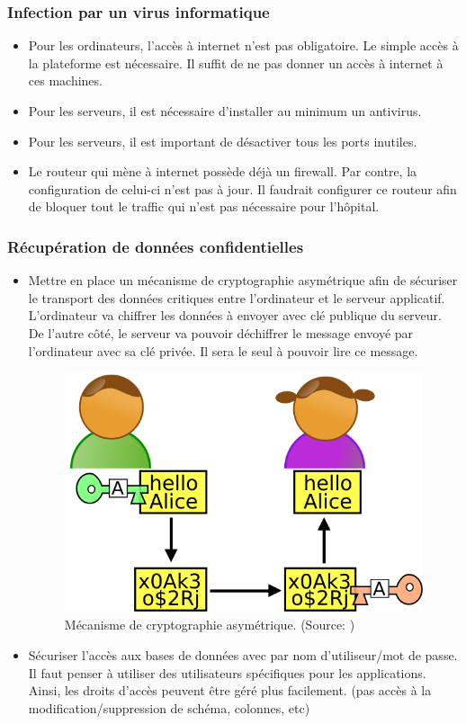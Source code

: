 \documentclass[12pt]{article}
\begin{document}
\subsubsection{Infection par un virus informatique}
\justify
\begin{itemize}
	\item Pour les ordinateurs, l'accès à internet n'est pas obligatoire. Le simple accès à la plateforme est nécessaire. Il suffit de ne pas donner un accès à internet à ces machines.
	\item Pour les serveurs, il est nécessaire d'installer au minimum un antivirus.
	\item Pour les serveurs, il est important de désactiver tous les ports inutiles.
	\item Le routeur qui mène à internet possède déjà un firewall. Par contre, la configuration de celui-ci n'est pas à jour. Il faudrait configurer ce routeur afin de bloquer tout le traffic qui n'est pas nécessaire pour l'hôpital.
\end{itemize}

\subsubsection{Récupération de données confidentielles}
\justify
\begin{itemize}
	\item Mettre en place un mécanisme de cryptographie asymétrique afin de sécuriser le transport des données critiques entre l'ordinateur et le serveur applicatif. L'ordinateur va chiffrer les données à envoyer avec clé publique du serveur. De l'autre côté, le serveur va pouvoir déchiffrer le message envoyé par l'ordinateur avec sa clé privée. Il sera le seul à pouvoir lire ce message.
	\begin{figure}[H]
	\includegraphics[width=\textwidth,height=200pt]{assets/Asymmetric_cryptography.png} 
	\caption[Mécanisme de cryptographie asymétrique]{Mécanisme de cryptographie asymétrique. (Source: \cite{asymetric-cryptography})}
	\label{fig:cryptoasym}
	\end{figure}
	\item Sécuriser l'accès aux bases de données avec par nom d'utiliseur/mot de passe. Il faut penser à utiliser des utilisateurs spécifiques pour les applications. Ainsi, les droits d'accès peuvent être géré plus facilement. (pas accès à la modification/suppression de schéma, colonnes, etc)
\end{itemize}
	
\end{document}
